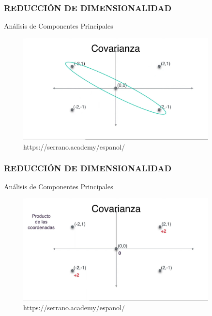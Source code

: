 \documentclass{beamer}
\begin{document}
\begin{frame}
	\frametitle{REDUCCIÓN DE DIMENSIONALIDAD}
	\begin{block}{Análisis de Componentes Principales}	
		\begin{figure}
			\includegraphics[width=0.9\textwidth]{PCA/IMG_3554.jpg}
			\caption{https://serrano.academy/espanol/}
		\end{figure}
	\end{block}
\end{frame}

\begin{frame}
	\frametitle{REDUCCIÓN DE DIMENSIONALIDAD}
	\begin{block}{Análisis de Componentes Principales}	
		\begin{figure}
			\includegraphics[width=0.9\textwidth]{PCA/IMG_3555.jpg}
			\caption{https://serrano.academy/espanol/}
		\end{figure}
	\end{block}
\end{frame}
\end{document}
